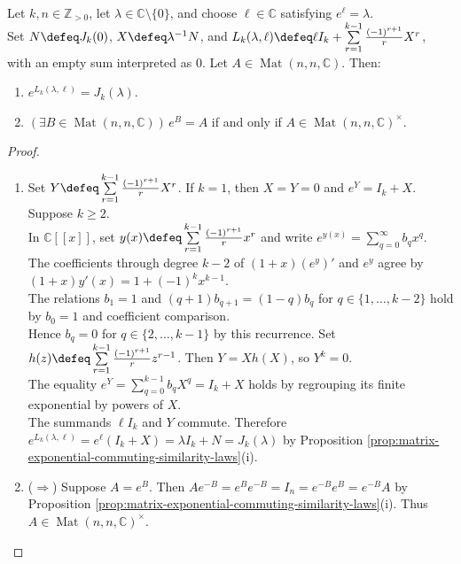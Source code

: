 \begin{theorem} \label{thm:complex-matrix-logarithm-existence} \\
Let $k,n\in\mathbb{Z}_{>0}$, let $\lambda\in\mathbb{C}\setminus\{0\}$, and choose $\ell\in\mathbb{C}$ satisfying $e^{\ell}=\lambda$.\\
Set $N\defeq J_k(0)$, $X\defeq\lambda^{-1}N$, and $L_k(\lambda,\ell)\defeq\ell I_k+\sum\limits_{r=1}^{k-1}\frac{(-1)^{r+1}}{r}X^r$, with an empty sum interpreted as $0$. Let $A\in\operatorname{Mat}(n,n,\mathbb{C})$. Then:
\begin{enumerate}[label=(\roman*)]
\setlength{\itemsep}{0pt}
\item $e^{L_k(\lambda,\ell)}=J_k(\lambda)$.
\item $(\exists B\in\operatorname{Mat}(n,n,\mathbb{C}))\,e^B=A$ if and only if $A\in\operatorname{Mat}(n,n,\mathbb{C})^{\times}$.
\end{enumerate}
\begin{proof}
\begin{enumerate}[label=(\roman*)]
\setlength{\itemsep}{0pt}
\item[$(i)$] Set $Y\defeq\sum\limits_{r=1}^{k-1}\frac{(-1)^{r+1}}{r}X^r$. If $k=1$, then $X=Y=0$ and $e^Y=I_k+X$. Suppose $k\geq2$.\\
In $\mathbb{C}[[x]]$, set $y(x)\defeq\sum\limits_{r=1}^{k-1}\frac{(-1)^{r+1}}{r}x^r$ and write $e^{y(x)}=\sum\limits_{q=0}^{\infty}b_qx^q$.\\
The coefficients through degree $k-2$ of $(1+x)(e^y)'$ and $e^y$ agree by $(1+x)y'(x)=1+(-1)^kx^{k-1}$.\\
The relations $b_1=1$ and $(q+1)b_{q+1}=(1-q)b_q$ for $q\in\{1,\ldots,k-2\}$ hold by $b_0=1$ and coefficient comparison.\\
Hence $b_q=0$ for $q\in\{2,\ldots,k-1\}$ by this recurrence. Set $h(z)\defeq\sum\limits_{r=1}^{k-1}\frac{(-1)^{r+1}}{r}z^{r-1}$. Then $Y=Xh(X)$, so $Y^k=0$.\\
The equality $e^Y=\sum\limits_{q=0}^{k-1}b_qX^q=I_k+X$ holds by regrouping its finite exponential by powers of $X$.\\
The summands $\ell I_k$ and $Y$ commute. Therefore $e^{L_k(\lambda,\ell)}=e^{\ell}(I_k+X)=\lambda I_k+N=J_k(\lambda)$ by Proposition \ref{prop:matrix-exponential-commuting-similarity-laws}(i).
\item[$(ii)$] ($\Rightarrow$) Suppose $A=e^B$. Then $Ae^{-B}=e^Be^{-B}=I_n=e^{-B}e^B=e^{-B}A$ by Proposition \ref{prop:matrix-exponential-commuting-similarity-laws}(i). Thus $A\in\operatorname{Mat}(n,n,\mathbb{C})^{\times}$.

\end{enumerate}
\end{proof}
\end{theorem}
